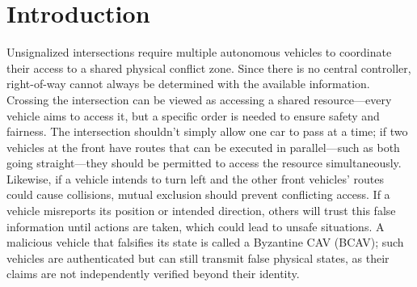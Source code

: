 \documentclass[letterpaper,10pt,conference]{IEEEtran}
\begin{document}
%
%
%
%
%
%
%
%
%
%




\section{Introduction}
\label{sec:introduction}

Unsignalized intersections require multiple autonomous vehicles to coordinate their access to a shared physical conflict zone. Since there is no central controller, right-of-way cannot always be determined with the available information. Crossing the intersection can be viewed as accessing a shared resource—every vehicle aims to access it, but a specific order is needed to ensure safety and fairness. The intersection shouldn't simply allow one car to pass at a time; if two vehicles at the front have routes that can be executed in parallel—such as both going straight—they should be permitted to access the resource simultaneously. Likewise, if a vehicle intends to turn left and the other front vehicles' routes could cause collisions, mutual exclusion should prevent conflicting access. If a vehicle misreports its position or intended direction, others will trust this false information until actions are taken, which could lead to unsafe situations. A malicious vehicle that falsifies its state is called a Byzantine CAV (BCAV); such vehicles are authenticated but can still transmit false physical states, as their claims are not independently verified beyond their identity. 
\end{document}

